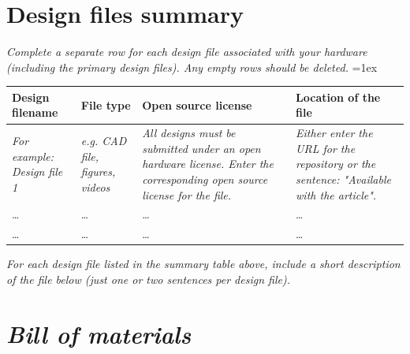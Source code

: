 \documentclass[11pt, letterpaper]{article}
\begin{document}
\section{Design files summary}
\textit{Complete a separate row for each design file associated with your hardware (including the primary design files). Any empty rows should be deleted.}
\vskip 0.1cm
\tabulinesep=1ex
\begin{tabu} to \linewidth {|X|X|X[1.5,1]|X[1.5,1]|} 
\hline
\textbf{Design filename} & \textbf{File type} & \textbf{Open source license} & \textbf{Location of the file} \\\hline
\textit{For example: Design file 1} & \textit{e.g. CAD file, figures, videos} & \textit{All designs must be submitted under an open hardware license. Enter the corresponding open source license for the file.} & \textit{Either enter the URL for the repository or the sentence: "Available with the article".}  \\\hline
\dots & \dots & \dots & \dots \\\hline
\dots & \dots & \dots & \dots \\\hline
\end{tabu}


\vskip 0.3cm
\noindent
\textit{For each design file listed in the summary table above, include a short description of the file below (just one or two sentences per design file).}

\section*{\textit{Bill of materials}}

\end{document}
